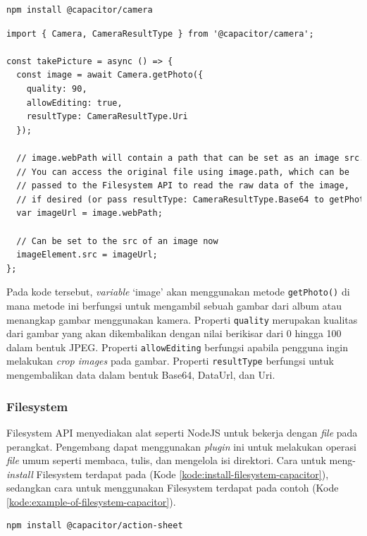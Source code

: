 \begin{lstlisting}[language=HTML, caption=Kode untuk Menginstal Plugin Camera, label=kode:install-camera-capacitor]
npm install @capacitor/camera
\end{lstlisting}

\begin{lstlisting}[language=HTML, caption=Contoh Kode Capacitor Camera, label=kode:capacitor-cam-example]
import { Camera, CameraResultType } from '@capacitor/camera';

const takePicture = async () => {
  const image = await Camera.getPhoto({
    quality: 90,
    allowEditing: true,
    resultType: CameraResultType.Uri
  });

  // image.webPath will contain a path that can be set as an image src.
  // You can access the original file using image.path, which can be
  // passed to the Filesystem API to read the raw data of the image,
  // if desired (or pass resultType: CameraResultType.Base64 to getPhoto)
  var imageUrl = image.webPath;

  // Can be set to the src of an image now
  imageElement.src = imageUrl;
};
\end{lstlisting}

Pada kode tersebut, \textit{variable} `image' akan menggunakan metode \texttt{getPhoto()} di mana metode ini berfungsi untuk mengambil sebuah gambar dari album atau menangkap gambar menggunakan kamera. Properti \texttt{quality} merupakan kualitas dari gambar yang akan dikembalikan dengan nilai berikisar dari 0 hingga 100 dalam bentuk JPEG. Properti \texttt{allowEditing} berfungsi apabila pengguna ingin melakukan \textit{crop images} pada gambar. Properti \texttt{resultType} berfungsi untuk mengembalikan data dalam bentuk Base64, DataUrl, dan Uri.

\subsubsection{Filesystem}
Filesystem API menyediakan alat seperti NodeJS untuk bekerja dengan \textit{file} pada perangkat. Pengembang dapat menggunakan \textit{plugin} ini untuk melakukan operasi \textit{file} umum seperti membaca, tulis, dan mengelola isi direktori. Cara untuk meng-\textit{install} Filesystem terdapat pada (Kode \ref{kode:install-filesystem-capacitor}), sedangkan cara untuk menggunakan Filesystem terdapat pada contoh (Kode \ref{kode:example-of-filesystem-capacitor}).

\begin{lstlisting}[language=HTML, caption=Kode untuk Menginstal Plugin Filesystem, label=kode:install-filesystem-capacitor]
npm install @capacitor/action-sheet
\end{lstlisting}

